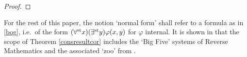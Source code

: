 \documentclass[reqno]{amsart}
\def\st{\textup{st}}
\newcommand{\tup}{\underline} %
\numberwithin{equation}{section}
\numberwithin{thm}{section}
\begin{document}
\begin{proof}
\end{proof}
For the rest of this paper, the notion `normal form' shall refer to a formula as in \eqref{bog}, i.e.\ of the form $(\forall^{\st}x)(\exists^{\st}y)\varphi(x,y)$ for $\varphi$ internal.  
It is shown in \cites{sambon, samzoo, samzooII} that the scope of Theorem \ref{consresultcor} includes the `Big Five' systems of Reverse Mathematics and the associated `zoo' from \cite{damirzoo}.  
\medskip
\end{document}
